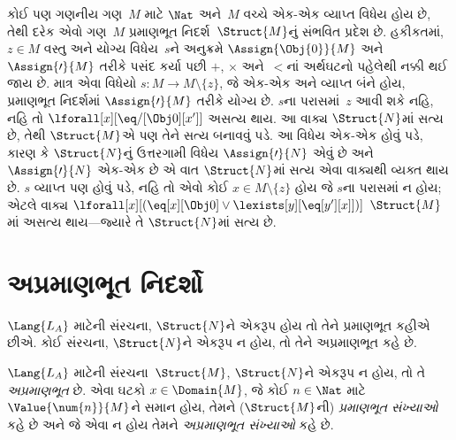 \begin{explain}
કોઈ પણ ગણનીય ગણ~$M$ માટે $\Nat$ અને~$M$ વચ્ચે
એક-એક વ્યાપ્ત વિધેય હોય છે, તેથી દરેક એવો ગણ~$M$ પ્રમાણભૂત
નિદર્શ~$\Struct{M}$નું સંભવિત પ્રદેશ છે. હકીકતમાં,
$z\in M$ વસ્તુ અને યોગ્ય વિધેય~$s$ને અનુક્રમે
$\Assign{\Obj{0}}{M}$ અને $\Assign{\prime}{M}$ તરીકે પસંદ કર્યા પછી
$+$, $\times$ અને~$<$નાં અર્થઘટનો પહેલેથી નક્કી થઈ જાય છે. માત્ર એવા
વિધેયો $s\colon M\to M\setminus\{z\}$, જે એક-એક અને
વ્યાપ્ત બંને હોય, પ્રમાણભૂત નિદર્શમાં $\Assign{\prime}{M}$
તરીકે યોગ્ય છે. $s$ના પરાસમાં~$z$ આવી શકે નહિ, નહિ તો
$\lforall[x][\eq/[\Obj 0][x']]$ અસત્ય થાય. આ વાક્ય
$\Struct{N}$માં સત્ય છે, તેથી $\Struct{M}$એ પણ તેને સત્ય બનાવવું
પડે. આ વિધેય એક-એક હોવું પડે, કારણ કે $\Struct{N}$નું
ઉત્તરગામી વિધેય $\Assign{\prime}{N}$ એવું છે અને
$\Assign{\prime}{N}$ એક-એક છે એ વાત $\Struct{N}$માં સત્ય એવા
વાક્યથી વ્યક્ત થાય છે. $s$ વ્યાપ્ત પણ હોવું પડે, નહિ
તો એવો કોઈ $x\in M\setminus\{z\}$ હોય જે $s$ના પરાસમાં ન હોય; એટલે
વાક્ય $\lforall[x][(\eq[x][\Obj 0]\lor\lexists[y][\eq[y'][x]])]$
$\Struct{M}$માં અસત્ય થાય—જ્યારે તે $\Struct{N}$માં સત્ય છે.
\end{explain}
\endgroup


\begingroup
\makeatletter{}\makeatother

\section{અપ્રમાણભૂત નિદર્શો}
\label{guunit:OLP-0194}


\begin{explain}
$\Lang{L_A}$ માટેની સંરચના, $\Struct{N}$ને એકરૂપ હોય તો તેને
પ્રમાણભૂત કહીએ છીએ. કોઈ સંરચના, $\Struct{N}$ને એકરૂપ ન હોય,
તો તેને અપ્રમાણભૂત કહે છે.
\end{explain}

\begin{defn}
$\Lang{L_A}$ માટેની સંરચના~$\Struct{M}$, $\Struct{N}$ને એકરૂપ
ન હોય, તો તે \emph{અપ્રમાણભૂત} છે. એવા
ઘટકો $x\in\Domain{M}$, જે કોઈ $n\in\Nat$ માટે
$\Value{\num{n}}{M}$ને સમાન હોય, તેમને ($\Struct{M}$ની)
\emph{પ્રમાણભૂત સંખ્યાઓ} કહે છે અને જે એવા ન હોય તેમને
\emph{અપ્રમાણભૂત સંખ્યાઓ} કહે છે.
\end{defn}

